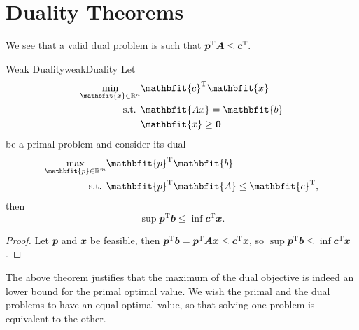 \documentclass[math, code]{amznotes}
\theoremstyle{remark}
\begin{document}
\section{Duality Theorems}
We see that a valid dual problem is such that $\mathbfit{p}^{\mathrm{T}}\mathbfit{A} \leq \mathbfit{c}^{\mathrm{T}}$.
\begin{thmbox}{Weak Duality}{weakDuality}
    Let 
    \begin{align*}
        \min_{\mathbfit{x} \in \R^n} & \mathbfit{c}^{\mathrm{T}}\mathbfit{x} \\
        \textrm{s.t. } & \mathbfit{Ax} = \mathbfit{b} \\
        & \mathbfit{x} \geq \mathbf{0}
    \end{align*}
    be a primal problem and consider its dual
    \begin{align*}
        \max_{\mathbfit{p} \in \R^m} & \mathbfit{p}^{\mathrm{T}}\mathbfit{b} \\
        \textrm{s.t. } & \mathbfit{p}^{\mathrm{T}}\mathbfit{A} \leq \mathbfit{c}^{\mathrm{T}},
    \end{align*}
    then 
    \begin{equation*}
        \sup \mathbfit{p}^{\mathrm{T}}\mathbfit{b} \leq \inf \mathbfit{c}^{\mathrm{T}}\mathbfit{x}.
    \end{equation*}
    \tcblower
    \begin{proof}
        Let $\mathbfit{p}$ and $\mathbfit{x}$ be feasible, then $\mathbfit{p}^{\mathrm{T}}\mathbfit{b} = \mathbfit{p}^{\mathrm{T}}\mathbfit{Ax} \leq \mathbfit{c}^{\mathrm{T}}\mathbfit{x}$, so $\sup \mathbfit{p}^{\mathrm{T}}\mathbfit{b} \leq \inf \mathbfit{c}^{\mathrm{T}}\mathbfit{x}$.
    \end{proof}
\end{thmbox}
The above theorem justifies that the maximum of the dual objective is indeed an lower bound for the primal optimal value. We wish the primal and the dual problems to have an equal optimal value, so that solving one problem is equivalent to the other.
\end{document}
